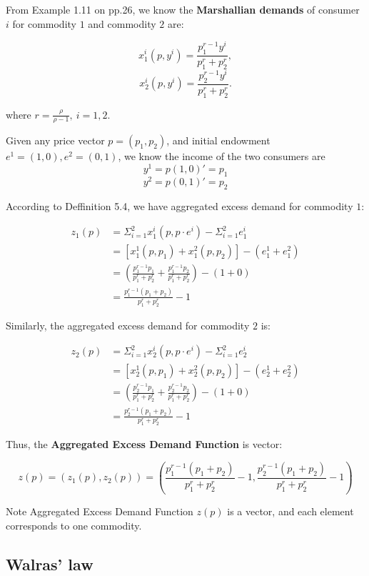 \documentclass{article}
\begin{document}
From Example 1.11 on pp.26, we know the \textbf{Marshallian demands} of consumer $i$ for commodity $1$ and commodity $2$ are:

$$x^i_1(p,y^i) = \frac{p^{r-1}_1y^i}{p_1^r+p_2^r},$$
$$x^i_2(p,y^i) = \frac{p^{r-1}_2y^i}{p_1^r+p_2^r}.$$

where $r= \frac{\rho}{\rho-1},\ i = 1,2$.

Given any price vector $p = (p_1,p_2)$, and initial endowment $e^1 = (1,0), e^2 = (0,1)$, we know the income of the two consumers are 
$$y^1= p(1,0)' = p_1$$
$$y^2= p(0,1)' = p_2$$

According to Deffinition 5.4, we have aggregated excess demand for commodity $1$:

\begin{align*}
z_1(p) &= \Sigma_{i=1}^2 x^i_1(p,p\cdot e^i) - \Sigma_{i=1}^2 e^i_1 \\
&= [x^1_1(p,p_1) + x^2_1(p,p_2)] -  (e^1_1+e^2_1) \\
&= ( \frac{p^{r-1}_1 p_1}{p_1^r+p_2^r} + \frac{p^{r-1}_1 p_2}{p_1^r+p_2^r}) - (1+0) \\
&= \frac{p^{r-1}_1 (p_1+p_2)}{p_1^r+p_2^r} -1
\end{align*}

Similarly, the aggregated excess demand for commodity $2$ is:

\begin{align*}
z_2(p) &= \Sigma_{i=1}^2 x^i_2(p,p\cdot e^i) - \Sigma_{i=1}^2 e^i_2 \\
&= [x^1_2(p,p_1) + x^2_2(p,p_2)] -  (e^1_2+e^2_2) \\
&= ( \frac{p^{r-1}_2 p_1}{p_1^r+p_2^r} + \frac{p^{r-1}_2 p_2}{p_1^r+p_2^r}) - (1+0) \\
&= \frac{p^{r-1}_2 (p_1+p_2)}{p_1^r+p_2^r} -1
\end{align*}

Thus, the  \textbf{Aggregated Excess Demand Function} is vector:

$$z(p) = (z_1(p),z_2(p)) = (\frac{p^{r-1}_1 (p_1+p_2)}{p_1^r+p_2^r} -1,\frac{p^{r-1}_2 (p_1+p_2)}{p_1^r+p_2^r} -1)$$


\begin{mdframed}[backgroundcolor=yellow!20,linecolor=white]
Note Aggregated Excess Demand Function $z(p)$ is a vector, and each element corresponds to one commodity.
\end{mdframed}

\subsection{Walras' law}
\end{document}
